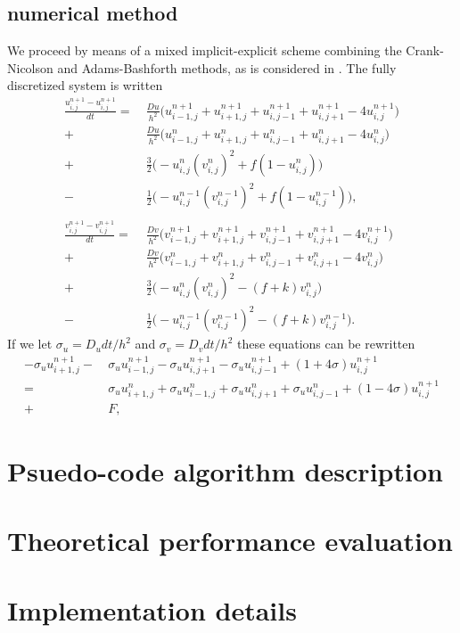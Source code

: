 \documentclass[a4paper,11pt]{article}
\newcommand{\ba}[1]{\begin{align*}    #1    \end{align*}}
\begin{document}
\subsection*{numerical method}
We proceed by means of a mixed implicit-explicit scheme combining the Crank-Nicolson and Adams-Bashforth methods, as is considered in \cite{Ruuth}.  The fully discretized system is written
\ba{
\frac{u_{i,j}^{n+1}-u_{i,j}^{n+1}}{dt} = & \ \frac{Du}{h^2}\bigg( u_{i-1,j}^{n+1} + u_{i+1,j}^{n+1} + u_{i,j-1}^{n+1}+ u_{i,j+1}^{n+1} - 4u_{i,j}^{n+1} \bigg) \\
+ & \ \frac{Du}{h^2}\bigg( u_{i-1,j}^{n} + u_{i+1,j}^{n} + u_{i,j-1}^{n}+ u_{i,j+1}^{n} - 4u_{i,j}^{n} \bigg) \\
+ & \ \frac{3}{2} \bigg( -u_{i,j}^{n} (v_{i,j}^{n})^2 + f(1-u_{i,j}^{n}) \bigg) \\
- & \ \frac{1}{2} \bigg( -u_{i,j}^{n-1} (v_{i,j}^{n-1})^2 + f(1-u_{i,j}^{n-1}) \bigg), \\ \\
\frac{v_{i,j}^{n+1}-v_{i,j}^{n+1}}{dt} = & \ \frac{Dv}{h^2}\bigg( v_{i-1,j}^{n+1} + v_{i+1,j}^{n+1} + v_{i,j-1}^{n+1}+ v_{i,j+1}^{n+1} - 4v_{i,j}^{n+1} \bigg) \\
+ & \ \frac{Dv}{h^2}\bigg( v_{i-1,j}^{n} + v_{i+1,j}^{n} + v_{i,j-1}^{n}+ v_{i,j+1}^{n} - 4v_{i,j}^{n} \bigg) \\
+ & \ \frac{3}{2} \bigg( -u_{i,j}^{n} (v_{i,j}^{n})^2 - (f+k)v_{i,j}^{n} \bigg) \\
- & \ \frac{1}{2} \bigg( -u_{i,j}^{n-1} (v_{i,j}^{n-1})^2  - (f+k)v_{i,j}^{n-1} \bigg).
}
If we let $\sigma_u = D_u dt/h^2$ and $\sigma_v = D_v dt/h^2$ these equations can be rewritten
\ba{
-\sigma_u u_{i+1,j}^{n+1} - & \ \sigma_u u_{i-1,j}^{n+1} -\sigma_u u_{i,j+1}^{n+1} -\sigma_u u_{i,j-1}^{n+1} + (1+ 4 \sigma) u_{i,j}^{n+1}\\ 
= & \ \sigma_u u_{i+1,j}^{n}+\sigma_u u_{i-1,j}^{n}+\sigma_u u_{i,j+1}^{n}+\sigma_u u_{i,j-1}^{n} + (1- 4 \sigma) u_{i,j}^{n+1}\\
+ & \ F,
}
\section*{Psuedo-code algorithm description}
\section*{Theoretical performance evaluation}
\section*{Implementation details}
\end{document}
